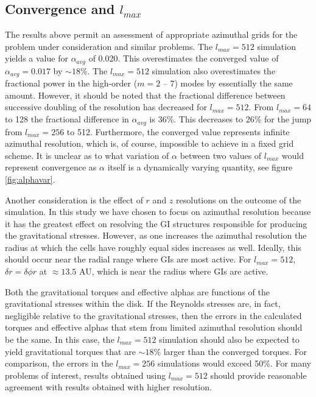 \documentclass[manuscript]{aastex}
\begin{document}
\subsection{Convergence and $l_{max}$}

The results above permit an assessment of appropriate azimuthal grids for the
problem under consideration and similar problems. The $l_{max} = 512$ simulation yields a value 
for $\alpha_{avg}$ of 0.020. This overestimates the converged value of $\alpha_{avg}
= 0.017$ by $\sim 18$\%. The $l_{max} = 512$ simulation also overestimates the fractional
power in the high-order ($m = 2$ -- 7) modes by essentially the same amount. However, it should be noted that the fractional difference between successive doubling of the resolution has decreased for $l_{max} = 512$. From $l_{max} =64$ to 128 the fractional difference in $\alpha_{avg}$ is 36\%. This decreases to 26\% for the jump from $l_{max} = 256$ to 512. Furthermore, the converged value represents infinite azimuthal resolution, which is, of course, impossible to achieve in a fixed grid scheme. It is unclear as to what variation of $\alpha$ between two values of $l_{max}$ would represent convergence as $\alpha$ itself is a dynamically varying quantity, see figure \ref{fig:alphavar}. 

Another consideration is the effect of $r$ and $z$ resolutions on the outcome of the simulation. In this study we have chosen to focus on azimuthal resolution because it has the greatest effect on resolving the GI structures responsible for producing the gravitational stresses. However, as one increases the azimuthal resolution the radius at which the cells have roughly equal sides increases as well. Ideally, this should occur near the radial range where GIs are most active. For $l_{max} = 512$, $\delta r = \delta \phi r$ at $\approx 13.5$ AU, which is near the radius where GIs are active.

Both the gravitational torques and effective alphas are functions of the
gravitational stresses within the disk.  If the Reynolds stresses are, in fact, negligible relative to the gravitational stresses,
then the errors in the calculated torques and effective alphas that stem from limited azimuthal resolution 
should be the same. In this case, the  $l_{max} = 512$ simulation should also be expected to yield
gravitational torques that are $\sim 18$\% larger than the converged torques.  For comparison, the
errors in the $l_{max} = 256$ simulations would exceed 50\%. For many problems of interest,
results obtained using $l_{max} = 512$ should provide reasonable agreement with results obtained 
with higher resolution. 
\end{document}
